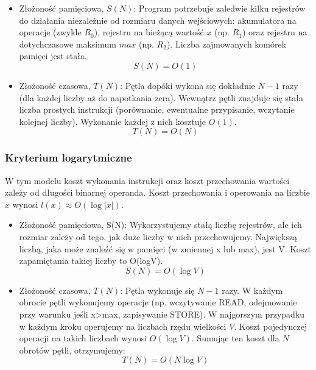 \documentclass[en, color=black, device=pad, mode=geey]{elegantnote}
\begin{document}
\begin{itemize}
    \item Złożoność pamięciowa, $S(N)$: Program potrzebuje zaledwie kilku rejestrów do działania niezależnie od rozmiaru danych wejściowych: akumulatora na operacje (zwykle $R_0$), rejestru na bieżącą wartość $x$ (np. $R_1$) oraz rejestru na dotychczasowe maksimum $max$ (np. $R_2$). Liczba zajmowanych komórek pamięci jest stała.
          \begin{equation}
              S(N) = O(1)
          \end{equation}
    \item Złożoność czasowa, $T(N)$: Pętla dopóki wykona się dokładnie $N-1$ razy (dla każdej liczby aż do napotkania zera). Wewnątrz pętli znajduje się stała liczba prostych instrukcji (porównanie, ewentualne przypisanie, wczytanie kolejnej liczby). Wykonanie każdej z nich kosztuje $O(1)$.
          \begin{equation}
              T(N) = O(N)
          \end{equation}
\end{itemize}


\subsubsection{Kryterium logarytmiczne}
W tym modelu koszt wykonania instrukcji oraz koszt przechowania wartości zależy od długości binarnej operanda. Koszt przechowania i operowania na liczbie $x$ wynosi $l(x) \approx O(\log |x|)$.

\begin{itemize}
    \item Złożoność pamięciowa, S(N): Wykorzystujemy stałą liczbę rejestrów, ale ich rozmiar zależy od tego, jak duże liczby w nich przechowujemy. Największą liczbą, jaka może znaleźć się w pamięci (w zmiennej x lub max), jest V. Koszt zapamiętania takiej liczby to O(logV).
          \begin{equation}
              S(N) = O(\log V)
          \end{equation}
    \item Złożoność czasowa, $T(N)$: Pętla wykonuje się $N-1$ razy. W każdym obrocie pętli wykonujemy operacje (np. wczytywanie READ, odejmowanie przy warunku jeśli x>max, zapisywanie STORE). W najgorszym przypadku w każdym kroku operujemy na liczbach rzędu wielkości $V$. Koszt pojedynczej operacji na takich liczbach wynosi $O(\log V)$. Sumując ten koszt dla $N$ obrotów pętli, otrzymujemy:
          \begin{equation}
              T(N) = O(N \log V)
          \end{equation}
\end{itemize}
\end{document}
